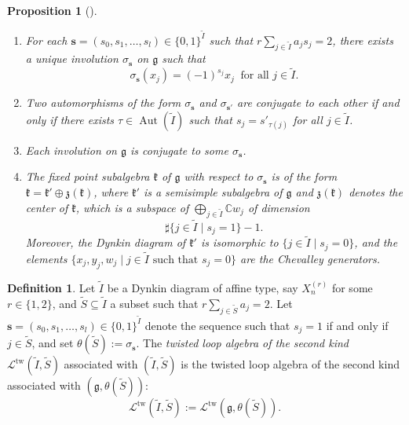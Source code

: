 \documentclass[12pt,a4paper]{amsart}
\newtheorem{prop}[thm]{Proposition}
\theoremstyle{definition}
\newtheorem{defi}[thm]{Definition}
\numberwithin{equation}{subsection}
\begin{document}
\begin{prop}[{\cite[Section 8.6]{Kac83}}]\label{prop: classification involution}
  \hfill
  \begin{enumerate}
    \item\label{item: classification involution construction} For each $\mathbf{s} = (s_0,s_1,\dots,s_l) \in \{0,1\}^{\tilde{I}}$ such that $r \sum_{j \in \tilde{I}} a_js_j = 2$, there exists a unique involution $\sigma_\mathbf{s}$ on $\mathfrak{g}$ such that
    \[
      \sigma_\mathbf{s}(x_j) = (-1)^{s_j}x_j \ \text{ for all } j \in \tilde{I}.
    \]
    \item\label{item: classification involution conjugation} Two automorphisms of the form $\sigma_\mathbf{s}$ and $\sigma_{\mathbf{s}'}$ are conjugate to each other if and only if there exists $\tau \in \operatorname{Aut}(\tilde{I})$ such that $s_j = s'_{\tau(j)}$ for all $j \in \tilde{I}$.
    \item\label{item: classification involution exhaustion} Each involution on $\mathfrak{g}$ is conjugate to some $\sigma_\mathbf{s}$.
    \item\label{item: classification involution frk} The fixed point subalgebra $\mathfrak{k}$ of $\mathfrak{g}$ with respect to $\sigma_\mathbf{s}$ is of the form $\mathfrak{k} = \mathfrak{k}' \oplus \mathfrak{z}(\mathfrak{k})$, where $\mathfrak{k}'$ is a semisimple subalgebra of $\mathfrak{g}$ and $\mathfrak{z}(\mathfrak{k})$ denotes the center of $\mathfrak{k}$, which is a subspace of $\bigoplus_{j \in \tilde{I}} \mathbb{C} w_j$ of dimension
    \[
      \sharp\{ j \in \tilde{I} \mid s_j = 1 \}-1.
    \]
    Moreover, the Dynkin diagram of $\mathfrak{k}'$ is isomorphic to $\{ j \in \tilde{I} \mid s_j = 0 \}$, and the elements $\{ x_j,y_j,w_j \mid j \in \tilde{I} \text{ such that } s_j = 0 \}$ are the Chevalley generators.
  \end{enumerate}
\end{prop}

\begin{defi}
  Let $\tilde{I}$ be a Dynkin diagram of affine type, say $X_n^{(r)}$ for some $r \in \{ 1,2 \}$, and $\tilde{S} \subseteq \tilde{I}$ a subset such that $r \sum_{j \in \tilde{S}} a_j = 2$.
  Let $\mathbf{s} = (s_0,s_1,\dots,s_l) \in \{ 0,1 \}^{\tilde{I}}$ denote the sequence such that $s_j = 1$ if and only if $j \in \tilde{S}$, and set $\theta(\tilde{S}) := \sigma_\mathbf{s}$.
  The \emph{twisted loop algebra of the second kind} $\mathcal{L}^{\mathrm{tw}}(\tilde{I},\tilde{S})$ associated with $(\tilde{I}, \tilde{S})$ is the twisted loop algebra of the second kind associated with $(\mathfrak{g},\theta(\tilde{S}))$:
  \[
    \mathcal{L}^{\mathrm{tw}}(\tilde{I},\tilde{S}) := \mathcal{L}^{\mathrm{tw}}(\mathfrak{g},\theta(\tilde{S})).
  \]
\end{defi}
\end{document}
